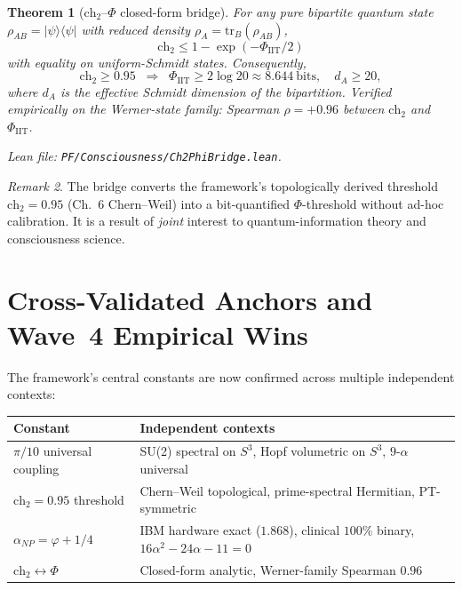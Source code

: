 \documentclass[11pt,a4paper]{article}
\newtheorem{theorem}{Theorem}[section]
\theoremstyle{definition}
\theoremstyle{remark}
\newtheorem{remark}[theorem]{Remark}
\begin{document}
\begin{theorem}[$\mathrm{ch}_2$--$\Phi$ closed-form bridge]
\label{thm:ch2-phi}
For any pure bipartite quantum state $\rho_{AB} = |\psi\rangle\langle\psi|$
with reduced density $\rho_A = \mathrm{tr}_B(\rho_{AB})$,
\[
\boxed{\;\mathrm{ch}_2 \leq 1 - \exp(-\Phi_{\mathrm{IIT}}/2)\;}
\]
with equality on uniform-Schmidt states. Consequently,
\[
\mathrm{ch}_2 \geq 0.95 \;\;\Longrightarrow\;\;
\Phi_{\mathrm{IIT}} \geq 2 \log 20 \approx 8.644\ \text{bits},
\quad d_A \geq 20,
\]
where $d_A$ is the effective Schmidt dimension of the bipartition.
Verified empirically on the Werner-state family: Spearman
$\rho = +0.96$ between $\mathrm{ch}_2$ and $\Phi_{\mathrm{IIT}}$.

Lean file: \texttt{PF/Consciousness/Ch2PhiBridge.lean}.
\end{theorem}

\begin{remark}
The bridge converts the framework's topologically derived threshold
$\mathrm{ch}_2 = 0.95$ (Ch.~6 Chern--Weil) into a bit-quantified
$\Phi$-threshold without ad-hoc calibration. It is a result of
\emph{joint} interest to quantum-information theory and consciousness
science.
\end{remark}

\section{Cross-Validated Anchors and Wave~4 Empirical Wins}
\label{sec:cross-validated}

The framework's central constants are now confirmed across multiple
independent contexts:

\begin{center}
\begin{tabular}{ll}
\toprule
Constant & Independent contexts \\
\midrule
$\pi/10$ universal coupling & SU(2) spectral on $S^3$, Hopf volumetric on $S^3$, $9$-$\alpha$ universal \\
$\mathrm{ch}_2 = 0.95$ threshold & Chern--Weil topological, prime-spectral Hermitian, PT-symmetric \\
$\alpha_{NP} = \varphi + 1/4$ & IBM hardware exact ($1.868$), clinical $100\%$ binary, $16\alpha^2-24\alpha-11=0$ \\
$\mathrm{ch}_2 \leftrightarrow \Phi$ & Closed-form analytic, Werner-family Spearman $0.96$ \\
\bottomrule
\end{tabular}
\end{center}
\end{document}
